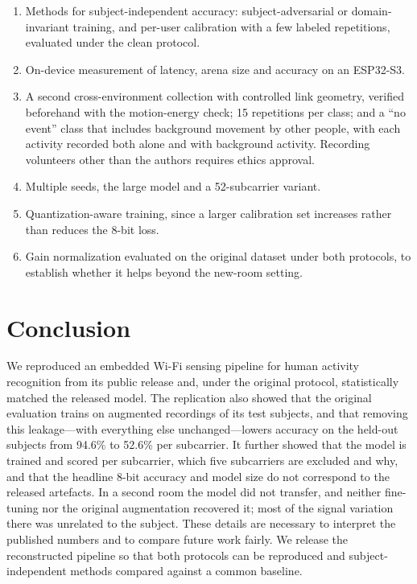 \documentclass[journal]{IEEEtran}
\begin{document}
\begin{enumerate}
\item Methods for subject-independent accuracy: subject-adversarial or
      domain-invariant training, and per-user calibration with a few labeled
      repetitions, evaluated under the clean protocol.
\item On-device measurement of latency, arena size and accuracy on an ESP32-S3.
\item A second cross-environment collection with controlled link geometry, verified
      beforehand with the motion-energy check; 15 repetitions per class; and a ``no
      event'' class that includes background movement by other people, with each
      activity recorded both alone and with background activity. Recording
      volunteers other than the authors requires ethics approval.
\item Multiple seeds, the large model and a 52-subcarrier variant.
\item Quantization-aware training, since a larger calibration set increases rather than
      reduces the 8-bit loss.
\item Gain normalization evaluated on the original dataset under both protocols, to
      establish whether it helps beyond the new-room setting.
\end{enumerate}

\section{Conclusion}

We reproduced an embedded Wi-Fi sensing pipeline for human activity recognition from
its public release and, under the original protocol, statistically matched the
released model. The replication also showed that the original evaluation trains on
augmented recordings of its test subjects, and that removing this leakage---with
everything else unchanged---lowers accuracy on the held-out subjects from 94.6\% to
52.6\% per subcarrier. It further showed that the model is trained and scored per
subcarrier, which five subcarriers are excluded and why, and that the headline 8-bit
accuracy and model size do not correspond to the released artefacts. In a second room
the model did not transfer, and neither fine-tuning nor the original augmentation
recovered it; most of the signal variation there was unrelated to the subject. These
details
are necessary to interpret the published numbers and to compare future work fairly.
We release the reconstructed pipeline so that both protocols can be reproduced and
subject-independent methods compared against a common baseline.
\end{document}

